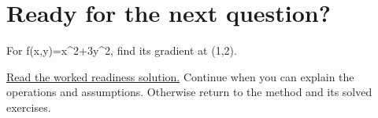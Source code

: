 \section*{Ready for the next question?}
\label{readiness:multivariable}
For f(x,y)=x\textasciicircum{}2+3y\textasciicircum{}2, find its gradient at (1,2).
\par\hyperref[solution:ready:multivariable]{Read the worked readiness solution.} Continue when you can explain the operations and assumptions. Otherwise return to the method and its solved exercises.
